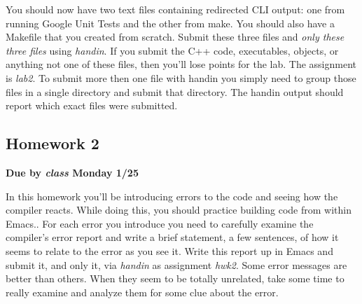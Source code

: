\documentclass[]{tufte-handout}
\begin{document}
You should now have two text files containing redirected CLI output: one from running Google Unit Tests and the other from make. You should also have a Makefile that you created from scratch. Submit these three files and \textit{only these three files} using \textit{handin}. If you submit the C++ code, executables, objects, or anything not one of these files, then you'll lose points for the lab. The assignment is \textit{lab2}. To submit more then one file with handin you simply need to group those files in a single directory and submit that directory. The handin output should report which exact files were submitted. 

\subsection{Homework 2}

\begin{center}
\textbf{Due by \textit{class} Monday 1/25}
\end{center}

In this homework you'll be introducing errors to the code and seeing how the compiler reacts. While doing this, you should practice building code from within Emacs.. For each error you introduce you need to carefully examine the compiler's error report and write a brief statement, a few sentences, of how it seems to relate to the error as you see it.  Write this report up in Emacs and submit it, and only it, via \textit{handin} as assignment \textit{hwk2}.  Some error messages are better than others. When they seem to be totally unrelated, take some time to really examine and analyze them for some clue about the error.
\end{document}
